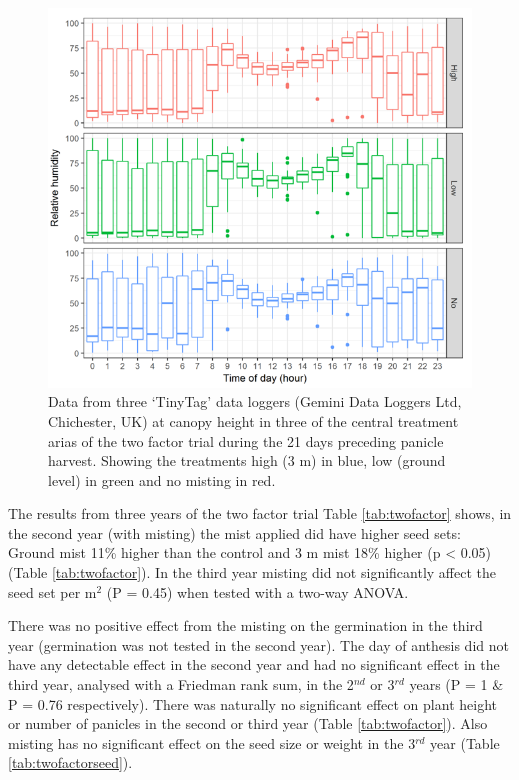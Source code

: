 \documentclass[fleqn, 15pt, lineno]{olplainarticle}
\begin{document}
\begin{figure}
\centering
\includegraphics[width=1\textwidth]{Figs/TinyTag}
\caption{\label{fig:tinytags} Data from three `TinyTag' data loggers (Gemini Data Loggers Ltd, Chichester, UK) at canopy height in three of the central treatment arias of the two factor trial during the 21 days preceding panicle harvest.
Showing the treatments high (3 m) in blue, low (ground level) in green and no misting in red.}
\end{figure}


The results from three years of the two factor trial Table \ref{tab:twofactor} shows, in the second year (with misting) the mist applied did have higher seed sets: Ground mist 11\% higher than the control and 3 m mist 18\% higher (p < 0.05) (Table \ref{tab:twofactor}).
In the third year misting did not significantly affect the seed set per m$^2$ (P = 0.45) when tested with a two-way ANOVA.

There was no positive effect from the misting on the germination in the third year (germination was not tested in the second year).
The day of anthesis did not have any detectable effect in the second year and had no significant effect in the third year, analysed with a Friedman rank sum, in the 2$^{nd}$ or 3$^{rd}$ years (P = 1 \& P = 0.76 respectively).
There was naturally no significant effect on plant height or number of panicles in the second or third year (Table \ref{tab:twofactor}).
Also misting has no significant effect on the seed size or weight in the 3$^{rd}$ year (Table \ref{tab:twofactorseed}).
\end{document}
